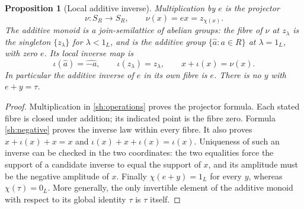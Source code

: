 \documentclass[11pt]{article}
\newtheorem{proposition}[theorem]{Proposition}
\begin{document}
\begin{proposition}[Local additive inverse]\label{sh:addinverse}
Multiplication by $e$ is the projector
\begin{equation}\tag{SH4}\label{sh:epsilon}
 \nu:S_R\to S_R,\qquad \nu(x)=ex=z_{\chi(x)}.
\end{equation}
The additive monoid is a join-semilattice of abelian groups:
the fibre of $\nu$ at $z_\lambda$ is the singleton $\{z_\lambda\}$
for $\lambda<1_L$, and is the additive group
$\{\widehat a:a\in R\}$ at $\lambda=1_L$, with zero $e$.
Its local inverse map is
\begin{equation}\tag{SH5}\label{sh:negative}
 \iota(\widehat a)=\widehat{-a},\qquad
 \iota(z_\lambda)=z_\lambda,\qquad
 x+\iota(x)=\nu(x).
\end{equation}
In particular the additive inverse of $e$ in its own fibre is $e$.
There is no $y$ with $e+y=\tau$.
\end{proposition}
\begin{proof}
Multiplication in \eqref{sh:operations} proves the projector formula.
Each stated fibre is closed under addition; its indicated point is
the fibre zero. Formula \eqref{sh:negative} proves the inverse law
within every fibre. It also proves $x+\iota(x)+x=x$ and
$\iota(x)+x+\iota(x)=\iota(x)$. Uniqueness of such an inverse
can be checked in the two coordinates: the two equalities force
the support of a candidate inverse to equal the support of $x$,
and its amplitude must be the negative amplitude of $x$.
Finally $\chi(e+y)=1_L$ for every $y$, whereas $\chi(\tau)=0_L$.
More generally, the only invertible element of the additive monoid
with respect to its global identity $\tau$ is $\tau$ itself.
\end{proof}
\end{document}
